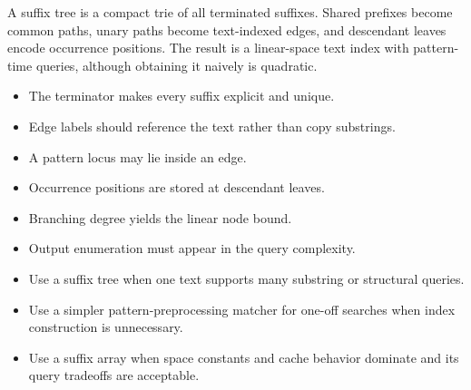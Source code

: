 \documentclass[11pt]{article}
\begin{document}
\begin{tcolorbox}[enhanced,breakable,title={Chapter synthesis},
  colback=Accent!5,colframe=Accent,fonttitle=\small\sffamily\bfseries,fontupper=\footnotesize,
  boxsep=0.6mm,left=1.5mm,right=1.5mm,top=1mm,bottom=1mm,before skip=3pt,after skip=3pt]
A suffix tree is a compact trie of all terminated suffixes. Shared prefixes become common paths, unary paths become text-indexed edges, and descendant leaves encode occurrence positions. The result is a linear-space text index with pattern-time queries, although obtaining it naively is quadratic.
\end{tcolorbox}

\begin{tcolorbox}[enhanced,breakable,title={Key takeaways},
  colback=white,colframe=Primary,fonttitle=\small\sffamily\bfseries,fontupper=\footnotesize,
  boxsep=0.6mm,left=1.5mm,right=1.5mm,top=1mm,bottom=1mm,before skip=3pt,after skip=3pt]
\begin{itemize}
  \item The terminator makes every suffix explicit and unique.
  \item Edge labels should reference the text rather than copy substrings.
  \item A pattern locus may lie inside an edge.
  \item Occurrence positions are stored at descendant leaves.
  \item Branching degree yields the linear node bound.
  \item Output enumeration must appear in the query complexity.
\end{itemize}
\end{tcolorbox}

\begin{tcolorbox}[enhanced,breakable,title={Algorithm selection / when to use this},
  colback=Primary!3,colframe=Primary,fonttitle=\small\sffamily\bfseries,fontupper=\footnotesize,
  boxsep=0.6mm,left=1.5mm,right=1.5mm,top=1mm,bottom=1mm,before skip=3pt,after skip=3pt]
\begin{itemize}
  \item Use a suffix tree when one text supports many substring or structural queries.
  \item Use a simpler pattern-preprocessing matcher for one-off searches when index construction is unnecessary.
  \item Use a suffix array when space constants and cache behavior dominate and its query tradeoffs are acceptable.
\end{itemize}
\end{tcolorbox}
\end{document}
